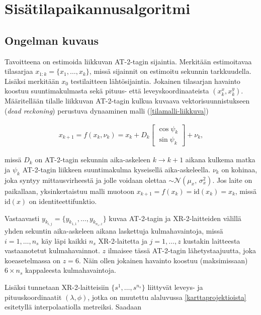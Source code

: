 \documentclass[
  12pt,
  a4paper, twoside]{book}
\begin{document}
\section{Sisätilapaikannusalgoritmi}

\subsection{Ongelman kuvaus} \label{ongelman-kuvaus}

Tavoitteena on estimoida liikkuvan AT-2-tagin sijaintia. Merkitään estimoitavaa tilasarjaa \(x_{1:k}=\{x_1,\ldots,x_k\}\), missä sijainnit on estimoitu sekunnin tarkkuudella. Lisäksi merkitään \(x_0\) testilaitteen lähtösijaintia. Jokainen tilasarjan havainto koostuu suuntimakulmasta sekä pituus- että leveyskoordinaateista \((x_k^x, x_k^y)\). Määritellään tilalle liikkuvan AT-2-tagin kulkua kuvaava vektorisuunnistukseen (\emph{dead reckoning}) perustuva dynaaminen malli (\ref{tilamalli-liikkuva})

\begin{align}\label{tilamalli-liikkuva}
x_{k+1}=f(x_k, \nu_k)=x_k+D_k \begin{bmatrix} \cos\psi_k \\ \sin\psi_k \end{bmatrix}+\nu_k,
\end{align}

\noindent missä \(D_k\) on AT-2-tagin sekunnin aika-askeleen \(k \rightarrow k+1\) aikana kulkema matka ja \(\psi_k\) AT-2-tagin liikkeen suuntimakulma kyseisellä aika-askeleella. \(\nu_k\) on kohinaa, joka syntyy mittausvirheestä ja jolle voidaan olettaa \(\sim \mathcal{N}(\mu_x,\,\sigma_x^{2})\). Jos laite on paikallaan, yksinkertaistuu malli muotoon \(x_{k+1}=f(x_k)=\text{id}(x_k)=x_k\), missä \(\text{id}(x)\) on identiteettifunktio.

Vastaavasti \(y_{k_{i,j}}=\{y_{k_{1,1}},\ldots,y_{k_{n_s,z}}\}\) kuvaa AT-2-tagin ja XR-2-laitteiden välillä yhden sekuntin aika-askeleen aikana laskettuja kulmahavaintoja, missä \(i=1,\ldots,n_s\) käy läpi kaikki \(n_s\) XR-2-laitetta ja \(j=1,\ldots,z\) kustakin laitteesta vastaanotetut kulmahavainnot. \(z\) ilmaisee tässä AT-2-tagin lähetystaajuutta, joka koeasetelmassa on \(z=6\). Näin ollen jokainen havainto koostuu (maksimissaan) \(6\times n_s\) kappaleesta kulmahavaintoja.

Lisäksi tunnetaan XR-2-laitteisiin \(\{s^1,\ldots,s^{n_s}\}\) liittyvät leveys- ja pituuskoordinaatit \((\lambda, \phi)\), jotka on muutettu alaluvussa \ref{karttaprojektioista} esitetyllä interpolaatiolla metreiksi. Saadaan
\end{document}
